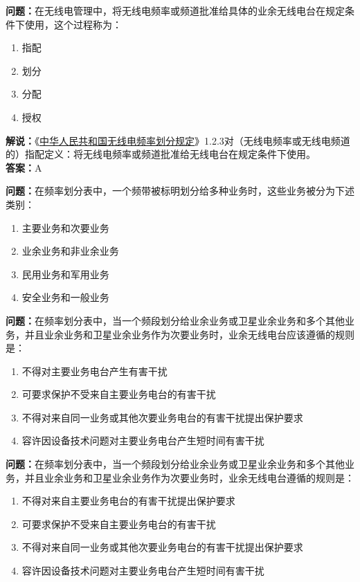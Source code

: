 \textbf{问题：}在无线电管理中，将无线电频率或频道批准给具体的业余无线电台在规定条件下使用，这个过程称为：
\begin{enumerate}[label=\Alph*), leftmargin=1.5cm]
	\item 指配
	\item 划分
	\item 分配
	\item 授权
\end{enumerate}
\textbf{解说：}《\href{https://www.miit.gov.cn/zwgk/zcwj/wjfb/txy/art/2020/art_066386284cd2449493586c81ccafed11.html}{中华人民共和国无线电频率划分规定}》1.2.3对（无线电频率或无线电频道的）指配定义：将无线电频率或频道批准给无线电台在规定条件下使用。\\
\textbf{答案：}A

\textbf{问题：}在频率划分表中，一个频带被标明划分给多种业务时，这些业务被分为下述类别：
\begin{enumerate}[label=\Alph*), leftmargin=1.5cm]
	\item 主要业务和次要业务
	\item 业余业务和非业余业务
	\item 民用业务和军用业务
	\item 安全业务和一般业务
\end{enumerate}

\textbf{问题：}在频率划分表中，当一个频段划分给业余业务或卫星业余业务和多个其他业务，并且业余业务和卫星业余业务作为次要业务时，业余无线电台应该遵循的规则是：
\begin{enumerate}[label=\Alph*), leftmargin=1.5cm]
	\item 不得对主要业务电台产生有害干扰
	\item 可要求保护不受来自主要业务电台的有害干扰
	\item 不得对来自同一业务或其他次要业务电台的有害干扰提出保护要求
	\item 容许因设备技术问题对主要业务电台产生短时间有害干扰
\end{enumerate}

\textbf{问题：}在频率划分表中，当一个频段划分给业余业务或卫星业余业务和多个其他业务，并且业余业务和卫星业余业务作为次要业务时，业余无线电台遵循的规则是：
\begin{enumerate}[label=\Alph*), leftmargin=1.5cm]
	\item 不得对来自主要业务电台的有害干扰提出保护要求
	\item 可要求保护不受来自主要业务电台的有害干扰
	\item 不得对来自同一业务或其他次要业务电台的有害干扰提出保护要求
	\item 容许因设备技术问题对主要业务电台产生短时间有害干扰
\end{enumerate}

